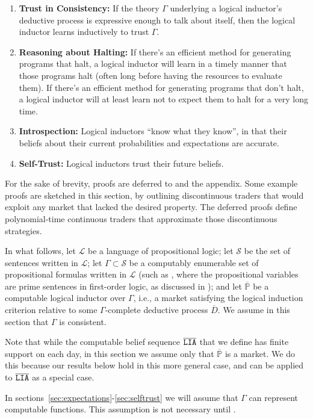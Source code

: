 \documentclass[authordate,onecolumn,noenvironments]{miri-tech-article}
\numberwithin{equation}{subsection}
\newcommand{\seq}[1]{{\overline{#1}}}
\newcommand{\representscomputations}{can represent computable functions}
\newcommand{\lic}{logical induction criterion}
\newcommand{\LIA}{\text{\upshape{\texttt{LIA}}}\xspace}
\newcommand{\BelState}{\mathbb{P}}
\newcommand{\pt}{\BelState}
\newcommand{\MP}{\seq{\pt}}
\newcommand{\dt}{D}
\newcommand{\DP}{\seq{\dt}}
\newcommand{\Theory}{\Gamma}
\newcommand{\Lang}{\mathcal{L}}
\newcommand{\Sentences}{\mathcal{S}}
\begin{document}
\begin{enumerate}
  \item \textbf{Trust in Consistency:} If the theory $\Theory$ underlying a logical inductor's deductive process is expressive enough to talk about itself, then the logical inductor learns inductively to trust $\Theory$.
  \item \textbf{Reasoning about Halting:} If there's an efficient method for generating programs that halt, a logical inductor will learn in a timely manner that those programs halt (often long before having the resources to evaluate them). If there's an efficient method for generating programs that don't halt, a logical inductor will at least learn not to expect them to halt for a very long time.
  \item \textbf{Introspection:} Logical inductors ``know what they know'', in that their beliefs about their current probabilities and expectations are accurate.
  \item \textbf{Self-Trust:} Logical inductors trust their future beliefs.
\end{enumerate}

\noindent For the sake of brevity, proofs are deferred to  and the appendix. Some example proofs are sketched in this section, by outlining discontinuous traders that would exploit any market that lacked the desired property. The deferred proofs define polynomial-time continuous traders that approximate those discontinuous strategies.



In what follows, let $\Lang$ be a language of propositional logic; let $\Sentences$ be the set of sentences written in $\Lang$; let $\Theory \subset \Sentences$ be a computably enumerable set of propositional formulas written in $\Lang$ (such as \PA, where the propositional variables are prime sentences in first-order logic, as discussed in ); and let $\MP$ be a computable logical inductor over $\Theory$, i.e., a market satisfying the \lic{} relative to some  $\Theory$-complete deductive process $\DP$. We assume in this section that $\Theory$ is consistent.
 
Note that while the computable belief sequence $\seq\LIA$ that we define has finite support on each day, in this section we assume only that $\MP$ is a market. We do this because our results below hold in this more general case, and can be applied to $\seq\LIA$ as a special case.

In sections~\ref{sec:expectations}-\ref{sec:selftrust} we will assume that $\Theory$ \representscomputations.  This assumption is not necessary until . 
\end{document}
